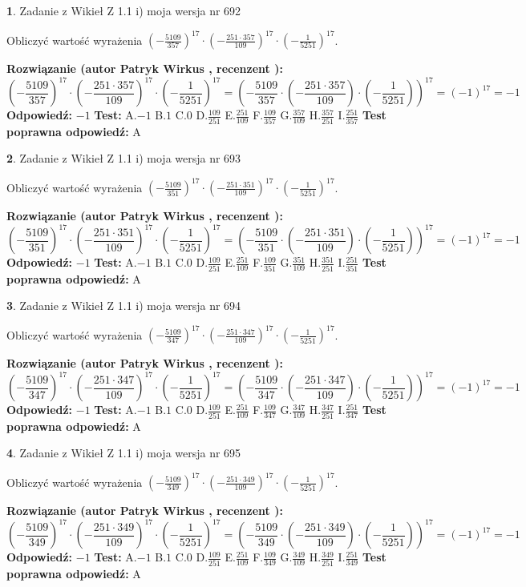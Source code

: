 \documentclass[12pt, a4paper]{article}
\theoremstyle{definition} %
\newtheorem{zad}{}
\newcommand{\zadStart}[1]{\begin{zad}#1\newline}
\newcommand{\zadStop}{\end{zad}}
\newcommand{\rozwStart}[2]{\noindent \textbf{Rozwiązanie (autor #1 , recenzent #2): }\newline}
\newcommand{\rozwStop}{\newline}
\newcommand{\odpStart}{\noindent \textbf{Odpowiedź:}\newline}
\newcommand{\odpStop}{\newline}
\newcommand{\testStart}{\noindent \textbf{Test:}\newline}
\newcommand{\testStop}{\newline}
\newcommand{\kluczStart}{\noindent \textbf{Test poprawna odpowiedź:}\newline}
\newcommand{\kluczStop}{\newline}
\begin{document}
\zadStart{Zadanie z Wikieł Z 1.1 i) moja wersja nr 692}

Obliczyć wartość wyrażenia $(-\frac{5109}{357})^{17} \cdot (-\frac{251 \cdot 357}{109})^{17} \cdot (-\frac{1}{5251})^{17}$.
\zadStop
\rozwStart{Patryk Wirkus}{}
$$(-\frac{5109}{357})^{17} \cdot (-\frac{251 \cdot 357}{109})^{17} \cdot (-\frac{1}{5251})^{17} = (-\frac{5109}{357} \cdot (-\frac{251 \cdot 357}{109}) \cdot (-\frac{1}{5251}))^{17} = (-1)^{17} = -1$$
\rozwStop
\odpStart
$-1$
\odpStop
\testStart
A.$-1$ B.$1$ C.$0$ D.$\frac{109}{251}$ E.$\frac{251}{109}$
F.$\frac{109}{357}$ G.$\frac{357}{109}$
H.$\frac{357}{251}$
I.$\frac{251}{357}$
\testStop
\kluczStart
A
\kluczStop



\zadStart{Zadanie z Wikieł Z 1.1 i) moja wersja nr 693}

Obliczyć wartość wyrażenia $(-\frac{5109}{351})^{17} \cdot (-\frac{251 \cdot 351}{109})^{17} \cdot (-\frac{1}{5251})^{17}$.
\zadStop
\rozwStart{Patryk Wirkus}{}
$$(-\frac{5109}{351})^{17} \cdot (-\frac{251 \cdot 351}{109})^{17} \cdot (-\frac{1}{5251})^{17} = (-\frac{5109}{351} \cdot (-\frac{251 \cdot 351}{109}) \cdot (-\frac{1}{5251}))^{17} = (-1)^{17} = -1$$
\rozwStop
\odpStart
$-1$
\odpStop
\testStart
A.$-1$ B.$1$ C.$0$ D.$\frac{109}{251}$ E.$\frac{251}{109}$
F.$\frac{109}{351}$ G.$\frac{351}{109}$
H.$\frac{351}{251}$
I.$\frac{251}{351}$
\testStop
\kluczStart
A
\kluczStop



\zadStart{Zadanie z Wikieł Z 1.1 i) moja wersja nr 694}

Obliczyć wartość wyrażenia $(-\frac{5109}{347})^{17} \cdot (-\frac{251 \cdot 347}{109})^{17} \cdot (-\frac{1}{5251})^{17}$.
\zadStop
\rozwStart{Patryk Wirkus}{}
$$(-\frac{5109}{347})^{17} \cdot (-\frac{251 \cdot 347}{109})^{17} \cdot (-\frac{1}{5251})^{17} = (-\frac{5109}{347} \cdot (-\frac{251 \cdot 347}{109}) \cdot (-\frac{1}{5251}))^{17} = (-1)^{17} = -1$$
\rozwStop
\odpStart
$-1$
\odpStop
\testStart
A.$-1$ B.$1$ C.$0$ D.$\frac{109}{251}$ E.$\frac{251}{109}$
F.$\frac{109}{347}$ G.$\frac{347}{109}$
H.$\frac{347}{251}$
I.$\frac{251}{347}$
\testStop
\kluczStart
A
\kluczStop



\zadStart{Zadanie z Wikieł Z 1.1 i) moja wersja nr 695}

Obliczyć wartość wyrażenia $(-\frac{5109}{349})^{17} \cdot (-\frac{251 \cdot 349}{109})^{17} \cdot (-\frac{1}{5251})^{17}$.
\zadStop
\rozwStart{Patryk Wirkus}{}
$$(-\frac{5109}{349})^{17} \cdot (-\frac{251 \cdot 349}{109})^{17} \cdot (-\frac{1}{5251})^{17} = (-\frac{5109}{349} \cdot (-\frac{251 \cdot 349}{109}) \cdot (-\frac{1}{5251}))^{17} = (-1)^{17} = -1$$
\rozwStop
\odpStart
$-1$
\odpStop
\testStart
A.$-1$ B.$1$ C.$0$ D.$\frac{109}{251}$ E.$\frac{251}{109}$
F.$\frac{109}{349}$ G.$\frac{349}{109}$
H.$\frac{349}{251}$
I.$\frac{251}{349}$
\testStop
\kluczStart
A
\kluczStop
\end{document}
